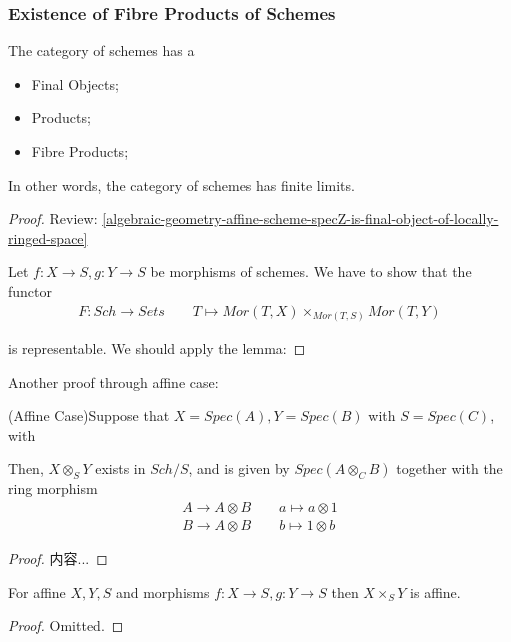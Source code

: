 \documentclass[Total.tex]{subfiles}
\begin{document}
				\subsubsection{Existence of Fibre Products of Schemes}
				
					\begin{lemma}
						The category of schemes has a
						
						\begin{itemize}
							\item Final Objects;
							\item Products;
							\item Fibre Products;
						\end{itemize}
						
						In other words, the category of schemes has finite limits.
					\end{lemma}
					
					\begin{proof}
						Review: \ref{algebraic-geometry-affine-scheme-specZ-is-final-object-of-locally-ringed-space}
						
						Let $f:X\rightarrow S,g:Y\rightarrow S$ be morphisms of schemes. We have to show that the functor
						\begin{gather*}
							F:Sch\rightarrow Sets\qquad T\mapsto Mor(T,X)\times_{Mor(T,S)} Mor(T,Y)
						\end{gather*}
						
						is representable. We should apply the lemma: 
					\end{proof}
					Another proof through affine case:
					\begin{lemma}
						(Affine Case)Suppose that $X=Spec(A),Y=Spec(B)$ with $S=Spec(C)$, with
						
						Then, $X\otimes_S Y$ exists in $Sch/S$, and is given by $Spec(A\otimes_C B)$ together with the ring morphism 
						\begin{gather*}
							A\rightarrow A\otimes B\qquad a\mapsto a\otimes 1\\
							B\rightarrow A\otimes B\qquad b\mapsto 1\otimes b
						\end{gather*}
					\end{lemma}
					\begin{proof}
						内容...
					\end{proof}
					
					\begin{corollary}
						For affine $X,Y,S$ and morphisms $f:X\rightarrow S,g:Y\rightarrow S$ then $X\times_S Y$ is affine.
					\end{corollary}
					\begin{proof}
						Omitted.
					\end{proof}
\end{document}
